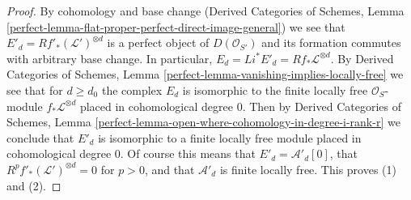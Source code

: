 \begin{proof}
\medskip\noindent
By cohomology and base change
(Derived Categories of Schemes,
Lemma \ref{perfect-lemma-flat-proper-perfect-direct-image-general})
we see that $E'_d = Rf'_*(\mathcal{L}')^{\otimes d}$
is a perfect object of $D(\mathcal{O}_{S'})$
and its formation commutes with arbitrary base change.
In particular, $E_d = Li^*E'_d = Rf_*\mathcal{L}^{\otimes d}$.
By Derived Categories of Schemes, Lemma
\ref{perfect-lemma-vanishing-implies-locally-free}
we see that for $d \geq d_0$ the complex $E_d$ is isomorphic to
the finite locally free $\mathcal{O}_S$-module
$f_*\mathcal{L}^{\otimes d}$ placed in
cohomological degree $0$. Then by
Derived Categories of Schemes, Lemma
\ref{perfect-lemma-open-where-cohomology-in-degree-i-rank-r}
we conclude that $E'_d$ is isomorphic to a finite locally free
module placed in cohomological degree $0$.
Of course this means that $E'_d = \mathcal{A}'_d[0]$,
that $R^pf'_*(\mathcal{L}')^{\otimes d} = 0$ for $p > 0$,
and that $\mathcal{A}'_d$ is finite locally free.
This proves (1) and (2).


\end{proof}
